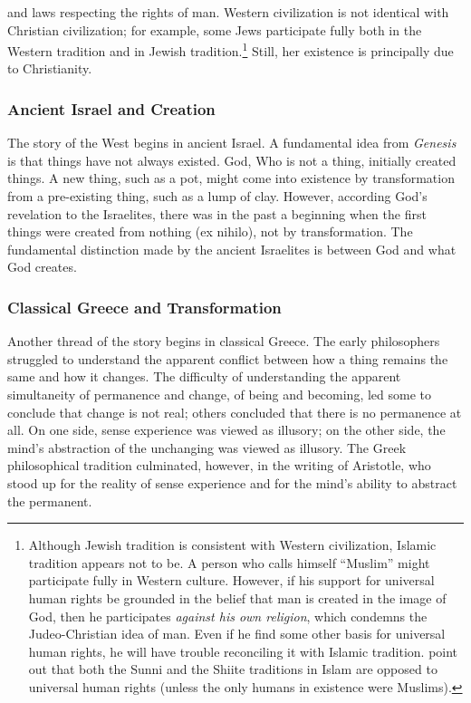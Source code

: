 \documentclass[twocolumn]{article}
\begin{document}
and laws respecting the rights of man.  Western civilization is not identical
with Christian civilization; for example, some Jews participate fully both in
the Western tradition and in Jewish tradition.\footnote{%
   Although Jewish tradition is consistent with Western civilization, Islamic
   tradition appears not to be.  A person who calls himself ``Muslim'' might
   participate fully in Western culture.  However, if his support for universal
   human rights be grounded in the belief that man is created in the image of
   God, then he participates \emph{against his own religion}, which condemns
   the Judeo-Christian idea of man.  Even if he find some other basis for
   universal human rights, he will have trouble reconciling it with Islamic
   tradition.  \cite{as2003} point out that both the Sunni and the Shiite
   traditions in Islam are opposed to universal human rights (unless the only
   humans in existence were Muslims).
}
Still, her existence is principally due to Christianity.

\subsubsection{Ancient Israel and Creation}

The story of the West begins in ancient Israel.  A fundamental idea from {\it
Genesis} is that things have not always existed.  God, Who is not a thing,
initially created things.  A new thing, such as a pot, might come into
existence by transformation from a pre-existing thing, such as a lump of clay.
However, according God's revelation to the Israelites, there was in the past a
beginning when the first things were created from nothing (ex nihilo), not by
transformation.  The fundamental distinction made by the ancient Israelites is
between God and what God creates.

\subsubsection{Classical Greece and Transformation}

Another thread of the story begins in classical Greece.  The early philosophers
struggled to understand the apparent conflict between how a thing remains the
same and how it changes.  The difficulty of understanding the apparent
simultaneity of permanence and change, of being and becoming, led some to
conclude that change is not real; others concluded that there is no permanence
at all.  On one side, sense experience was viewed as illusory; on the other
side, the mind's abstraction of the unchanging was viewed as illusory.  The
Greek philosophical tradition culminated, however, in the writing of Aristotle,
who stood up for the reality of sense experience and for the mind's ability to
abstract the permanent.
\end{document}
